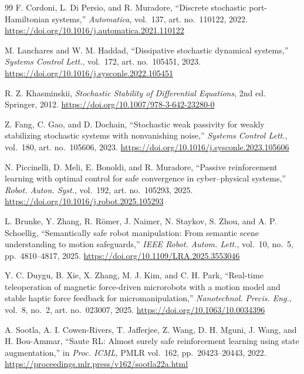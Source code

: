 \documentclass[11pt]{article}
\begin{document}
\begin{thebibliography}{99}
F. Cordoni, L. Di Persio, and R. Muradore,
``Discrete stochastic port-Hamiltonian systems,''
\emph{Automatica}, vol.~137, art. no.~110122, 2022.
\url{https://doi.org/10.1016/j.automatica.2021.110122}

M. Lanchares and W. M. Haddad,
``Dissipative stochastic dynamical systems,''
\emph{Systems Control Lett.}, vol.~172, art. no.~105451, 2023.
\url{https://doi.org/10.1016/j.sysconle.2022.105451}

R. Z. Khasminskii,
\emph{Stochastic Stability of Differential Equations}, 2nd ed. Springer, 2012.
\url{https://doi.org/10.1007/978-3-642-23280-0}

Z. Fang, C. Gao, and D. Dochain,
``Stochastic weak passivity for weakly stabilizing stochastic systems with
nonvanishing noise,''
\emph{Systems Control Lett.}, vol.~180, art. no.~105606, 2023.
\url{https://doi.org/10.1016/j.sysconle.2023.105606}

N. Piccinelli, D. Meli, E. Bonoldi, and R. Muradore,
``Passive reinforcement learning with optimal control for safe convergence
in cyber--physical systems,''
\emph{Robot. Auton. Syst.}, vol.~192, art. no.~105293, 2025.
\url{https://doi.org/10.1016/j.robot.2025.105293}

L. Brunke, Y. Zhang, R. R\"{o}mer, J. Naimer, N. Staykov, S. Zhou, and
A. P. Schoellig,
``Semantically safe robot manipulation: From semantic scene understanding to
motion safeguards,''
\emph{IEEE Robot. Autom. Lett.}, vol.~10, no.~5, pp.~4810--4817, 2025.
\url{https://doi.org/10.1109/LRA.2025.3553046}

Y. C. Duygu, B. Xie, X. Zhang, M. J. Kim, and C. H. Park,
``Real-time teleoperation of magnetic force-driven microrobots with a motion
model and stable haptic force feedback for micromanipulation,''
\emph{Nanotechnol. Precis. Eng.}, vol.~8, no.~2, art. no.~023007, 2025.
\url{https://doi.org/10.1063/10.0034396}

A. Sootla, A. I. Cowen-Rivers, T. Jafferjee, Z. Wang, D. H. Mguni,
J. Wang, and H. Bou-Ammar,
``Saute RL: Almost surely safe reinforcement learning using state
augmentation,''
in \emph{Proc. ICML}, PMLR vol.~162, pp.~20423--20443, 2022.
\url{https://proceedings.mlr.press/v162/sootla22a.html}

\end{thebibliography}
\end{document}
